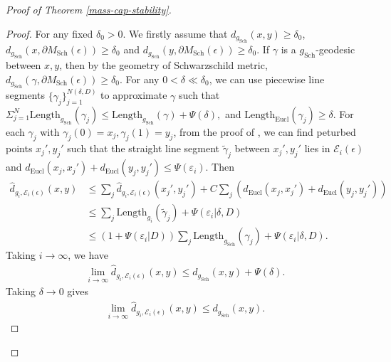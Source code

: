 \documentclass[letter]{amsart}
\theoremstyle{definition}
\theoremstyle{remark}
\begin{document}
\begin{proof}[Proof of Theorem \ref{mass-cap-stability}]
\begin{proof}
	For any fixed $\delta _0>0$. We firstly assume that $d_{g_{\mathrm{Sch}}}(x,y) \geq \delta _0$, $d_{g_{\mathrm{Sch}}} (x, \partial M_{\mathrm{Sch}}(\epsilon ) ) \geq \delta _0$ and $d_{g_{\mathrm{Sch}}}(y, \partial M_{\mathrm{Sch}}(\epsilon ) ) \geq \delta _0$. If $\gamma $ is a $g_{\mathrm{Sch}}$-geodesic between $x, y$, then by the geometry of Schwarzschild metric, $d_{g_{\mathrm{Sch}}}(\gamma , \partial M_{\mathrm{Sch}}(\epsilon ) ) \geq \delta _0$. For any $0< \delta \ll\delta _0$, we can use piecewise line segments $\{\gamma _j\} _{j=1}^{N(\delta ,D)} $ to approximate $\gamma $ such that $ \Sigma_{j=1}^{N} \mathrm{Length}_{g_{\mathrm{Sch}}}(\gamma _j) \leq  \mathrm{Length}_{g_{\mathrm{Sch}}}(\gamma )  + \Psi (\delta) ,$ and $\mathrm{Length}_{\mathrm{Eucl}}(\gamma _j) \geq \delta $. For each $\gamma _j$ with $\gamma _j(0)= x_j,  \gamma _j(1) = y_j$, from the proof of \cite[Lemma 4.5]{DS'23}, we can find peturbed points $x_j', y_j'$ such that the straight line segment $\tilde{\gamma} _j$ between $x_j', y_j'$ lies in $\mathcal{E}_i(\epsilon )$ and $d_{\mathrm{Eucl}}(x_j, x_j') + d_{\mathrm{Eucl}}(y_j, y_j') \leq \Psi (\varepsilon _i)$. Then
\begin{align*}
	\hat{d}_{g_i, \mathcal{E}_i(\epsilon )}(x,y) &\leq \sum_{j} \hat{d}_{g_i, \mathcal{E}_i(\epsilon )}(x_j', y_j') + C \sum_{j} ( d_{\mathrm{Eucl}}(x_j, x_j') + d_{\mathrm{Eucl}}(y_j, y_j') )\\
						     &\leq \sum_{j} \mathrm{Length}_{g_i} (\tilde{\gamma} _j) +  \Psi (\varepsilon _i| \delta , D )\\
						     & \leq (1+ \Psi (\varepsilon _i|D) ) \sum_{j}\mathrm{Length}_{g_{\mathrm{Sch}}}(\gamma_j) + \Psi (\varepsilon _i| \delta ,D).
\end{align*}
Taking $i\to \infty$, we have 
\begin{align*}
	\lim_{i\to \infty}\hat{d}_{g_i, \mathcal{E}_i(\epsilon )}(x,y) \leq d_{g_{\mathrm{Sch}}}(x,y) + \Psi (\delta ).
\end{align*}
Taking $\delta \to 0$ gives 
\begin{align}\label{dlt-0-dis}
\lim_{i\to \infty}\hat{d}_{g_i, \mathcal{E}_i(\epsilon )}(x,y) \leq d_{g_{\mathrm{Sch}}}(x,y).
\end{align}




\end{proof}
\end{proof}
\end{document}
